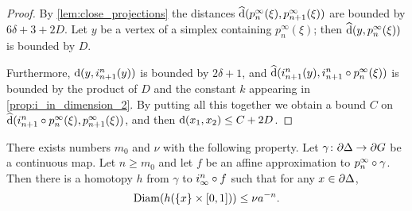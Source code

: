 \documentclass[a4paper]{article}
\begin{document}
\begin{proof}
  By \cref{lem:close_projections} the distances $\operatorname{\widehat{d}}(p^\infty_n(\xi),
  p^\infty_{n+1}(\xi))$ are bounded by $6\delta + 3 + 2D$. Let $y$ be a vertex
  of a simplex containing $p^\infty_n(\xi)$; then $\operatorname{\widehat{d}}(y, p^\infty_n(\xi))$
  is bounded by $D$.
  
  Furthermore, $\operatorname{d}(y, i^n_{n+1}(y))$ is bounded by $2\delta+1$, and
  $\operatorname{\widehat{d}}(i^n_{n+1}(y), i^n_{n+1}\circ p^\infty_n (\xi))$ is bounded by
  the product of $D$ and the constant $k$ appearing in
  \cref{prop:i_in_dimension_2}. By putting all this together we obtain a bound
  $C$ on $\operatorname{\widehat{d}}(i^n_{n+1}\circ p^\infty_n(\xi), p^\infty_{n+1}(\xi))$,
  and then $\operatorname{d}(x_1, x_2) \leq C + 2D$.
\end{proof}

\begin{proposition}\label{prop:uniform_homotopies}
  There exists numbers $m_0$ and $\nu$ with the following property. Let
  $\gamma\colon\partial\Delta\to\partial G$ be a continuous map. Let $n \geq
  m_0$ and let $f$ be an affine approximation to $p^\infty_n\circ\gamma$.
  Then there is a homotopy $h$ from $\gamma$ to $i^n_\infty\circ f$ such
  that for any $x \in \partial\Delta$,
  \begin{equation*}
    \operatorname{Diam}(h(\{x\}\times [0,1])) \leq \nu a^{-n}.
  \end{equation*}
\end{proposition}
\end{document}
